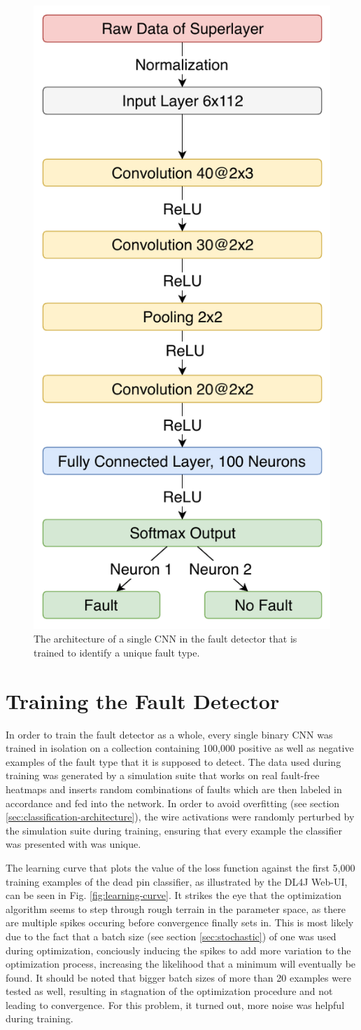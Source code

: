 \begin{figure}[h]
  \centering
  \includegraphics[width=.4\textwidth]{../figures/fault_architecture}
  \caption{The architecture of a single CNN in the fault detector that
  is trained to identify a unique fault type.}
  \label{fig:fault-architecture}
\end{figure}

\section{Training the Fault Detector}

In order to train the fault detector as a whole, every single binary
CNN was trained in isolation on a collection containing 100,000
positive as well as negative examples of the fault type that it is
supposed to detect. The data used during training was
generated by a simulation suite that works on real fault-free heatmaps
and inserts random combinations of faults which are then labeled in
accordance and fed into the network. In order to avoid overfitting
(see section \ref{sec:classification-architecture}), the wire activations
were randomly perturbed by the simulation suite during training,
ensuring that every example the classifier was presented with was
unique.

The learning curve that plots the value of the loss function against
the first 5,000 training examples of the dead pin classifier, as
illustrated by the DL4J Web-UI, can be seen in
Fig. \ref{fig:learning-curve}. It strikes the eye that the
optimization algorithm seems to step through
rough terrain in the parameter space, as there are multiple spikes
occuring before convergence finally sets in. This is most likely due
to the fact that a batch size (see section \ref{sec:stochastic}) of
one was used during optimization, conciously inducing the spikes to
add more variation to the optimization process, increasing
the likelihood that a minimum will eventually be found. It should be
noted that bigger batch sizes of more than 20 examples were tested as
well, resulting in stagnation of the optimization procedure and not
leading to convergence. For this problem, it turned out, more noise
was helpful during training.

